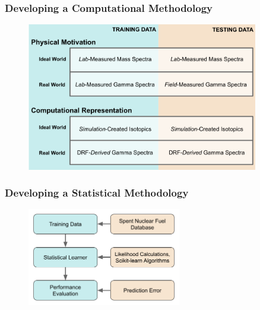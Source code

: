 \begin{frame}
  \frametitle{Developing a Computational Methodology} %
  \begin{figure}[h!]
    \centering
    \includegraphics[width=0.9\textwidth]{./figures/project_design.png}
  \end{figure}
\end{frame}

\begin{frame}
  \frametitle{Developing a Statistical Methodology}
  \begin{figure}
    \centering
    \includegraphics[width=0.6\textwidth]{./figures/meth_pres.png}
  \end{figure}
\end{frame}


